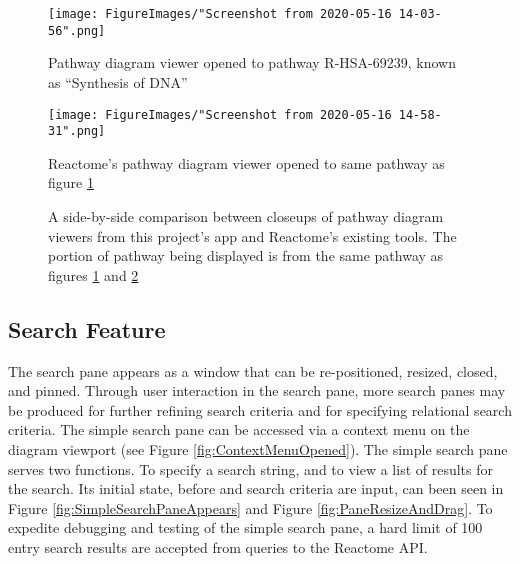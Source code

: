 \documentclass[12pt, letterpaper]{report}
\begin{document}
\begin{landscape}
	
\begin{figure}[t!]
	\begin{center}
		\texttt{[image: FigureImages/"Screenshot from 2020-05-16 14-03-56".png]}
	\end{center}
	\caption{Pathway diagram viewer opened to pathway R-HSA-69239, known as ``Synthesis of DNA''}

	\label{fig:DiagramForDNASynth}
\end{figure}

\begin{figure}[b!]
	\begin{center}
		\texttt{[image: FigureImages/"Screenshot from 2020-05-16 14-58-31".png]}
	\end{center}
	\caption{Reactome's pathway diagram viewer opened to same pathway as figure \ref{fig:DiagramForDNASynth}}
	
	\label{fig:ReactomesDiagramForDNASynth}
\end{figure}

\end{landscape}
\newpage

\begin{figure}[h]
	\begin{center}
	\end{center}
	\caption{A side-by-side comparison between closeups of pathway diagram viewers from this project's app and Reactome's existing tools. The portion of pathway being displayed is from the same pathway as figures \ref{fig:DiagramForDNASynth} and \ref{fig:ReactomesDiagramForDNASynth}}
	
	\label{fig:ReactomeVsProjectVisualComparison}
\end{figure}
\newpage

\subsection{Search Feature}
The search pane appears as a window that can be re-positioned, resized, closed, and pinned. Through user interaction in the search pane, more search panes may be produced for further refining search criteria and for specifying relational search criteria. The simple search pane can be accessed via a context menu on the diagram viewport (see Figure \ref{fig:ContextMenuOpened}). The simple search pane serves two functions. To specify a search string, and to view a list of results for the search. Its initial state, before and search criteria are input, can been seen in Figure \ref{fig:SimpleSearchPaneAppears} and Figure \ref{fig:PaneResizeAndDrag}. To expedite debugging and testing of the simple search pane, a hard limit of 100 entry search results are accepted from queries to the Reactome API.
\end{document}
